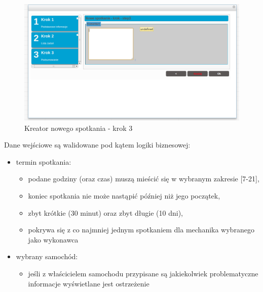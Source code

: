		\begin{figure}[H]
			\centering
			\includegraphics[width=1.0\textwidth]{images/newAppointment_step3}
			\caption[Kreator nowego spotkania - krok 3]{
				Kreator nowego spotkania - krok 3
			}
			\label{app:wizard_newAppointment_step3}
		\end{figure}		
		Dane wejściowe są walidowane pod kątem logiki biznesowej:
		\begin{itemize}
			\item termin spotkania:
			\begin{itemize}
				\item podane godziny (oraz czas) muszą mieścić się w wybranym zakresie [7-21],
				\item koniec spotkania nie może nastąpić później niż jego początek,
				\item zbyt krótkie (30 minut) oraz zbyt długie (10 dni),
				\item pokrywa się z co najmniej jednym spotkaniem dla mechanika wybranego jako wykonawca
			\end{itemize} 
			\item wybrany samochód:
			\begin{itemize}
				\item jeśli z właścicielem samochodu przypisane są jakiekolwiek problematyczne informacje wyświetlane jest ostrzeżenie
			\end{itemize}
		\end{itemize}

